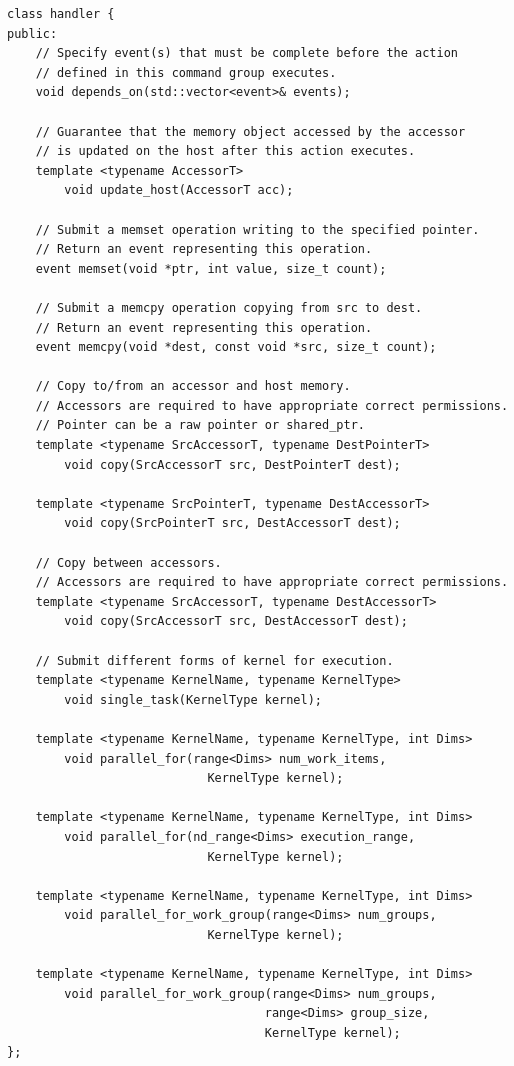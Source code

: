 \begin{lstlisting}[caption={}]
class handler { 
public:
	// Specify event(s) that must be complete before the action 
	// defined in this command group executes.
	void depends_on(std::vector<event>& events);
	
	// Guarantee that the memory object accessed by the accessor
	// is updated on the host after this action executes.
	template <typename AccessorT>
		void update_host(AccessorT acc);
	
	// Submit a memset operation writing to the specified pointer.
	// Return an event representing this operation.
	event memset(void *ptr, int value, size_t count); 
	
	// Submit a memcpy operation copying from src to dest.
	// Return an event representing this operation.
	event memcpy(void *dest, const void *src, size_t count);
	
	// Copy to/from an accessor and host memory.
	// Accessors are required to have appropriate correct permissions.
	// Pointer can be a raw pointer or shared_ptr.
	template <typename SrcAccessorT, typename DestPointerT>
		void copy(SrcAccessorT src, DestPointerT dest);
		
	template <typename SrcPointerT, typename DestAccessorT>
		void copy(SrcPointerT src, DestAccessorT dest);
	
	// Copy between accessors.
	// Accessors are required to have appropriate correct permissions.
	template <typename SrcAccessorT, typename DestAccessorT>
		void copy(SrcAccessorT src, DestAccessorT dest);
	
	// Submit different forms of kernel for execution.
	template <typename KernelName, typename KernelType>
		void single_task(KernelType kernel);
		
	template <typename KernelName, typename KernelType, int Dims>
		void parallel_for(range<Dims> num_work_items, 
							KernelType kernel); 
							
	template <typename KernelName, typename KernelType, int Dims>
		void parallel_for(nd_range<Dims> execution_range, 
							KernelType kernel);
							
	template <typename KernelName, typename KernelType, int Dims>
		void parallel_for_work_group(range<Dims> num_groups, 
							KernelType kernel);
							
	template <typename KernelName, typename KernelType, int Dims>
		void parallel_for_work_group(range<Dims> num_groups,
									range<Dims> group_size, 
									KernelType kernel);
};
\end{lstlisting}

